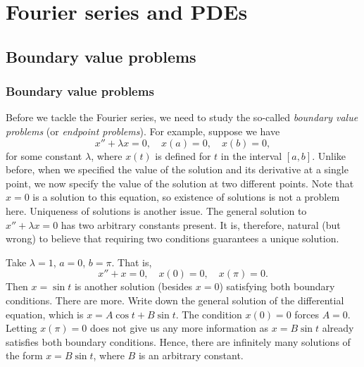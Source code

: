 \documentclass[12pt]{book}
\begin{document}

\chapter{Fourier series and PDEs} \label{FS:chapter}


\section{Boundary value problems} \label{bvp:section}


\subsection{Boundary value problems}

Before we tackle the Fourier series, we need to study
the so-called 
\emph{boundary value problems}
(or \emph{endpoint problems}).  For example,
suppose we have
\begin{equation*}
x'' + \lambda x = 0, \quad x(a) = 0, \quad x(b) = 0,
\end{equation*}
for some constant $\lambda$, where $x(t)$ is defined for $t$ in the interval
$[a,b]$.
Unlike before, when we specified the value of the solution and its derivative
at a single point, we now specify the value of the solution at two different
points.  Note that $x=0$ is a solution to this equation, so existence of
solutions is not a problem here.  Uniqueness of solutions is another issue.
The general solution to $x'' + \lambda x = 0$ has two
arbitrary constants present.  It is, therefore,
natural (but wrong) to believe that requiring two
conditions guarantees a unique solution.

\begin{example}
Take $\lambda = 1$,
$a=0$, $b=\pi$.  That is,
\begin{equation*}
x'' + x = 0, \quad x(0) = 0, \quad x(\pi) = 0.
\end{equation*}
Then $x = \sin t$ is another solution (besides $x=0$) satisfying both boundary
conditions.  There are more.  Write down the general
solution of the differential equation, which is $x= A \cos t + B \sin t$.
The condition $x(0) = 0$ forces $A=0$.  Letting $x(\pi) = 0$ does not
give us any more information as $x = B \sin t$ already satisfies both
boundary conditions.
Hence, there are infinitely many solutions of the form $x = B \sin t$,
where $B$ is an arbitrary constant.
\end{example}
\end{document}
